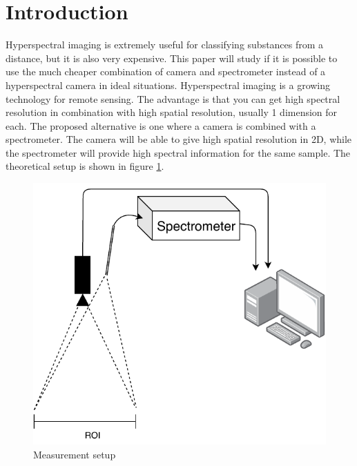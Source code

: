 \section{Introduction}
Hyperspectral imaging is extremely useful for classifying substances from a distance, but it is also very expensive. This paper will study if it is possible to use the much cheaper combination of camera and spectrometer instead of a hyperspectral camera in ideal situations. 
Hyperspectral imaging is a growing technology for remote sensing. The advantage is that you can get high spectral resolution in combination with high spatial resolution, usually 1 dimension for each. The proposed alternative is one where a camera is combined with a spectrometer. The camera will be able to give high spatial resolution in 2D, while the spectrometer will provide high spectral information for the same sample. The theoretical setup is shown in figure \ref{fig:measurement_setup}. 


\begin{figure}[hb]
    \centering
    \includegraphics[width=1\textwidth]{figures/pt_setup.pdf}
    \caption{Measurement setup}
    \label{fig:measurement_setup}
\end{figure}

